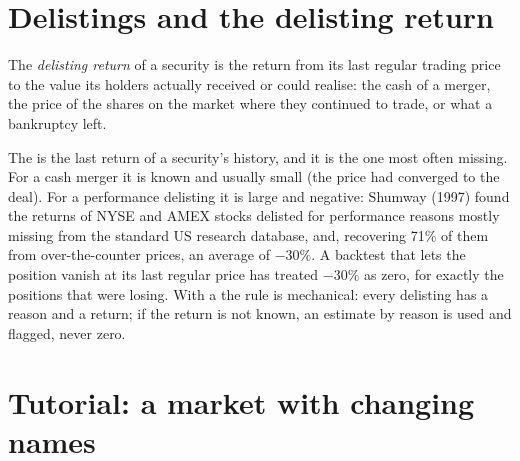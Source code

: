 \section{Delistings and the delisting return}

\begin{definition}\label{def:rs:universe-symbology-and-corporate-actions:delisting}
The \emph{delisting return} of a security is the return from its last regular trading price to the value
its holders actually received or could realise: the cash of a merger, the price of the shares on the market where they continued
to trade, or what a bankruptcy left.
\end{definition}

The  is the last return of a security's history, and it is the one most often missing. For a cash merger it is
known and usually small (the price had converged to the deal). For a performance delisting it is large and negative: Shumway
(1997) found the returns of NYSE and AMEX stocks delisted for performance reasons mostly missing from the standard US research
database, and, recovering 71\% of them from over-the-counter prices, an average of $-30\%$. A backtest that lets the position
vanish at its last regular price has treated $-30\%$ as zero, for exactly the positions that were losing. With a 
the rule is mechanical: every delisting has a reason and a return; if the return is not known, an estimate by reason is used and
flagged, never zero.

\section{Tutorial: a market with changing names}\label{tut:rs:universe-symbology-and-corporate-actions:master}


